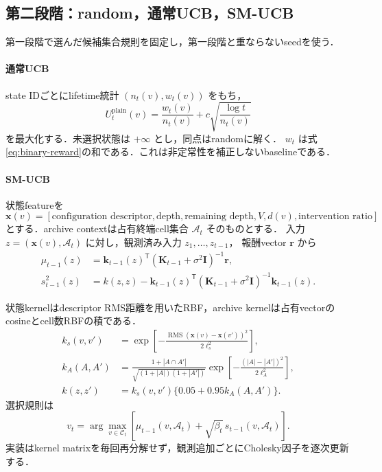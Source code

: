 \documentclass[a4paper,11pt]{ltjsarticle}
\newcommand{\outarchive}{\mathcal A}
\begin{document}
\subsection{第二段階：random，通常UCB，SM-UCB}

第一段階で選んだ候補集合規則を固定し，第一段階と重ならないseedを使う．

\paragraph{通常UCB}
state IDごとにlifetime統計 \((n_t(v),w_t(v))\) をもち，
\begin{equation}
  U_t^{\mathrm{plain}}(v)
  =\frac{w_t(v)}{n_t(v)}
  +c\sqrt{\frac{\log t}{n_t(v)}}
  \label{eq:plain-ucb}
\end{equation}
を最大化する．未選択状態は \(+\infty\) とし，同点はrandomに解く．
\(w_t\) は式\eqref{eq:binary-reward}の和である．これは非定常性を補正しないbaselineである．

\paragraph{SM-UCB}
状態featureを
\begin{equation}
  \bm x(v)=
  [\text{configuration descriptor},
   \text{depth},\text{remaining depth},V,
   d(v),\text{intervention ratio}]
\end{equation}
とする．archive contextは占有終端cell集合 \(\outarchive_t\) そのものとする．
入力 \(z=(\bm x(v),\outarchive_t)\) に対し，観測済み入力 \(z_1,\ldots,z_{t-1}\)，
報酬vector \(\bm r\) から
\begin{align}
  \mu_{t-1}(z)
  &={\bm k}_{t-1}(z)^\mathsf T
  (\bm K_{t-1}+\sigma^2\bm I)^{-1}\bm r,\\
  s_{t-1}^2(z)
  &=k(z,z)-{\bm k}_{t-1}(z)^\mathsf T
  (\bm K_{t-1}+\sigma^2\bm I)^{-1}{\bm k}_{t-1}(z).
  \label{eq:smucb-posterior}
\end{align}

状態kernelはdescriptor RMS距離を用いたRBF，archive kernelは占有vectorのcosineとcell数RBFの積である．
\begin{align}
  k_s(v,v')
  &=\exp\left[
    -\frac{\operatorname{RMS}(\bm x(v)-\bm x(v'))^2}{2\ell_s^2}
  \right],\\
  k_A(A,A')
  &=
  \frac{1+|A\cap A'|}{\sqrt{(1+|A|)(1+|A'|)}}
  \exp\left[-\frac{(|A|-|A'|)^2}{2\ell_A^2}\right],\\
  k(z,z')&=k_s(v,v')\{0.05+0.95k_A(A,A')\}.
  \label{eq:smucb-kernel}
\end{align}
選択規則は
\begin{equation}
  v_t=\arg\max_{v\in\mathcal C_t}
  \left[
  \mu_{t-1}(v,\outarchive_t)
  +\sqrt{\beta_t}\,s_{t-1}(v,\outarchive_t)
  \right].
  \label{eq:smucb-score}
\end{equation}
実装はkernel matrixを毎回再分解せず，観測追加ごとにCholesky因子を逐次更新する．
\end{document}
